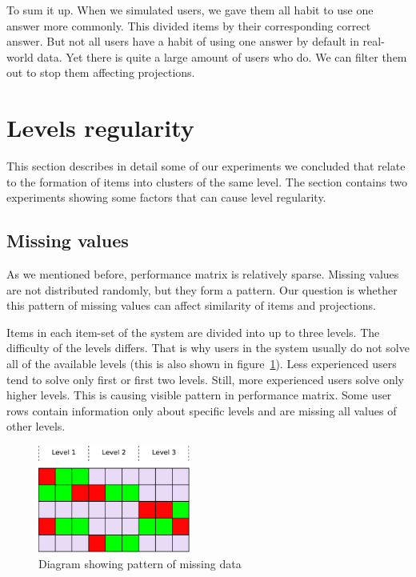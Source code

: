 \documentclass[
  printed, %
  table,   %
  nolof,     %
  nolot,     %
  color,
  final,
  nocover
]{fithesis3}
\begin{document}

To sum it up. When we simulated users, we gave them all habit to use one answer more commonly. This divided items by their corresponding correct answer. But not all users have a habit of using one answer by default in real-world data. Yet there is quite a large amount of users who do. We can filter them out to stop them affecting projections.


\section{Levels regularity}\label{evaulation-levels-regularity}

This section describes in detail some of our experiments we concluded that relate to the formation of items into clusters of the same level. The section contains two experiments showing some factors that can cause level regularity.


\subsection{Missing values}\label{missing-values}


As we mentioned before, performance matrix is relatively sparse. Missing values are not distributed randomly, but they form a pattern. Our question is whether this pattern of missing values can affect similarity of items and projections.


Items in each item-set of the system are divided into up to three levels. The difficulty of the levels differs. That is why users in the system usually do not solve all of the available levels (this is also shown in figure~\ref{fig:missing_pattern_diagram}). Less experienced users tend to solve only first or first two levels. Still, more experienced users solve only higher levels. This is causing visible pattern in performance matrix. Some user rows contain information only about specific levels and are missing all values of other levels.

\begin{figure}
  \includegraphics[width=5cm]{img/missing_pattern_diagram}
  \caption{Diagram showing pattern of missing data}
  \label{fig:missing_pattern_diagram}
\end{figure}
\end{document}
